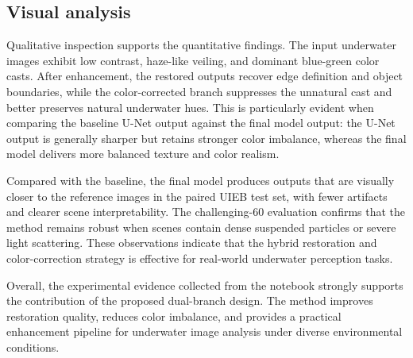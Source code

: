 \subsection{Visual analysis}

Qualitative inspection supports the quantitative findings. The input underwater images exhibit low contrast, haze-like veiling, and dominant blue-green color casts. After enhancement, the restored outputs recover edge definition and object boundaries, while the color-corrected branch suppresses the unnatural cast and better preserves natural underwater hues. This is particularly evident when comparing the baseline U-Net output against the final model output: the U-Net output is generally sharper but retains stronger color imbalance, whereas the final model delivers more balanced texture and color realism.

Compared with the baseline, the final model produces outputs that are visually closer to the reference images in the paired UIEB test set, with fewer artifacts and clearer scene interpretability. The challenging-60 evaluation confirms that the method remains robust when scenes contain dense suspended particles or severe light scattering. These observations indicate that the hybrid restoration and color-correction strategy is effective for real-world underwater perception tasks.

Overall, the experimental evidence collected from the notebook strongly supports the contribution of the proposed dual-branch design. The method improves restoration quality, reduces color imbalance, and provides a practical enhancement pipeline for underwater image analysis under diverse environmental conditions.
